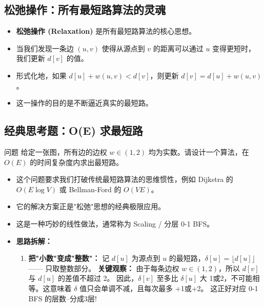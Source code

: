 \documentclass[11pt]{beamer}
\begin{document}
\subsection{松弛操作：所有最短路算法的灵魂}
\begin{frame}
    \begin{itemize}
        \item \textbf{松弛操作 (Relaxation)} 是所有最短路算法的核心思想。
        \item 当我们发现一条边 $(u, v)$ 使得从源点到 $v$ 的距离可以通过 $u$ 变得更短时，我们更新 $d[v]$ 的值。
        \item 形式化地，如果 $d[u] + w(u, v) < d[v]$，则更新 $d[v] = d[u] + w(u, v)$。
        \item 这一操作的目的是不断逼近真实的最短路。
    \end{itemize}
\end{frame}

\subsection{经典思考题：O(E) 求最短路}
\begin{frame}
    \begin{block}{问题}
        给定一张图，所有边的边权 $w \in (1, 2)$ 均为实数。请设计一个算法，在 $O(E)$ 的时间复杂度内求出最短路。
    \end{block}
    \begin{itemize}
        \item 这个问题要求我们打破传统最短路算法的思维惯性，例如 Dijkstra 的 $O(E \log V)$ 或 Bellman-Ford 的 $O(VE)$。
        \item 它的解决方案正是"松弛"思想的经典极限应用。
    \end{itemize}
\end{frame}

\begin{frame}
    \begin{itemize}
        \item 这是一种巧妙的线性做法，通常称为 Scaling / 分层 0-1 BFS。
        \item \textbf{思路拆解：}
        \begin{enumerate}
            \item \textbf{把"小数"变成"整数"：}
            记 $d[u]$ 为源点到 $u$ 的最短路，$\delta[u] = \lfloor d[u] \rfloor$ —— 只取整数部分。
            \textbf{关键观察：} 由于每条边权 $w \in (1, 2)$，所以 $d[v]$ 与 $d[u]$ 的差值不超过 2。
            因此，$\delta[v]$ 至多比 $\delta[u]$ 大 1或2，不可能相等。这意味着 $\delta$ 值只会单调不减，且每次最多 +1或+2。
            这正好对应 0-1 BFS 的层数--分成3层!
        \end{enumerate}
    \end{itemize}
\end{frame}
\end{document}
